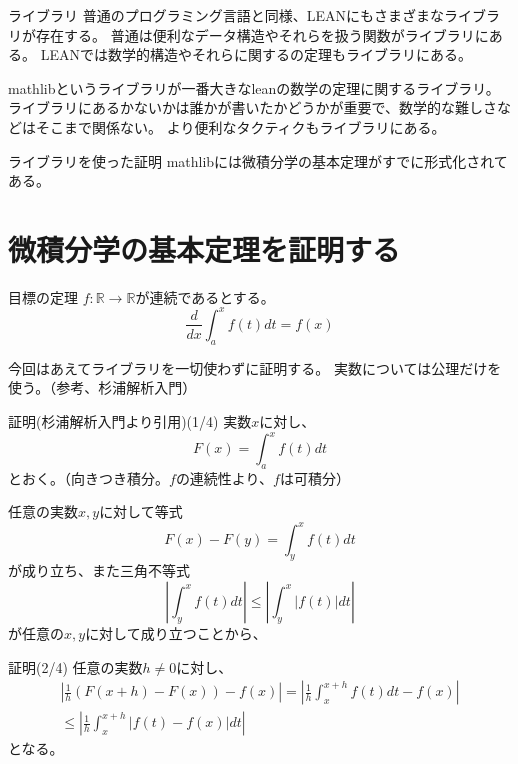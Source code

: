 \documentclass[unicode,12pt]{beamer}%
\begin{document}
\begin{frame}{ライブラリ}
  普通のプログラミング言語と同様、LEANにもさまざまなライブラリが存在する。
  普通は便利なデータ構造やそれらを扱う関数がライブラリにある。
  LEANでは数学的構造やそれらに関するの定理もライブラリにある。

  mathlibというライブラリが一番大きなleanの数学の定理に関するライブラリ。
  ライブラリにあるかないかは誰かが書いたかどうかが重要で、数学的な難しさなどはそこまで関係ない。
  より便利なタクティクもライブラリにある。
\end{frame}

\begin{frame}{ライブラリを使った証明}
  mathlibには微積分学の基本定理がすでに形式化されてある。
\end{frame}

\section{微積分学の基本定理を証明する}

\begin{frame}{目標の定理}
  $f:\mathbb{R}\to\mathbb{R}$が連続であるとする。
  $$
    \frac{d}{dx}\int^x_af(t)dt=f(x)
  $$

  今回はあえてライブラリを一切使わずに証明する。
  実数については公理だけを使う。（参考、杉浦解析入門）
\end{frame}

\begin{frame}{証明(杉浦解析入門より引用)(1/4)}
  実数$x$に対し、
  $$
    F(x)=\int^x_af(t)dt
  $$
  とおく。（向きつき積分。$f$の連続性より、$f$は可積分）

  任意の実数$x, y$に対して等式
  $$
    F(x)-F(y)=\int^x_yf(t)dt
  $$
  が成り立ち、また三角不等式
  $$
    \left\lvert\int^x_yf(t)dt\right\rvert\leq\left\lvert\int^x_y\lvert f(t)\rvert dt\right\rvert
  $$
  が任意の$x, y$に対して成り立つことから、
\end{frame}

\begin{frame}{証明(2/4)}
  任意の実数$h\neq0$に対し、
  \begin{align*}
    \left\lvert\frac{1}{h}(F(x+h)-F(x))-f(x)\right\rvert
    =\left\lvert\frac{1}{h}\int^{x+h}_xf(t)dt-f(x)\right\rvert\\
    \leq\left\lvert\frac{1}{h}\int^{x+h}_x\lvert f(t)-f(x)\rvert dt\right\rvert 
  \end{align*}
  となる。
\end{frame}
\end{document}
